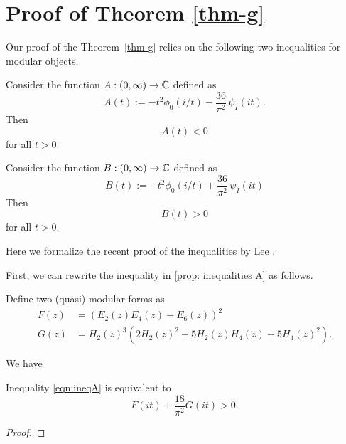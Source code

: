\section{Proof of Theorem \ref{thm-g}}\label{sec: g}
Our proof of the Theorem~\ref{thm-g} relies on the following two inequalities for modular objects.
\begin{proposition}\label{prop: inequalities A}
Consider the function $A:(0,\infty)\to\mathbb{C}$ defined as
\begin{equation}\label{eqn:defA}
A(t):=-t^2\phi_0(i/t)-\frac{36}{\pi^2}\,\psi_I(it).
\end{equation}
Then
\begin{equation}\label{eqn:ineqA}
  A(t) < 0
\end{equation}
for all $t > 0$.
\end{proposition}

\begin{proposition}\label{prop: inequalities B}
Consider the function $B:(0,\infty)\to\mathbb{C}$ defined as
\begin{equation}\label{eqn:defB}
  B(t) := -t^2\phi_0(i/t)+\frac{36}{\pi^2}\,\psi_I(it)
\end{equation}
Then
\begin{equation}\label{eqn:ineqB}
  B(t) > 0
\end{equation}
for all $t > 0$.
\end{proposition}

Here we formalize the recent proof of the inequalities by Lee \cite{Lee}.

First, we can rewrite the inequality in \ref{prop: inequalities A} as follows.

\begin{definition}
Define two (quasi) modular forms as
\begin{align}
  F(z) &= (E_2(z) E_4(z) - E_6(z))^2 \label{eqn:defF} \\
  G(z) &= H_2(z)^{3} (2 H_{2}(z)^{2} + 5 H_{2}(z) H_{4}(z) + 5 H_{4}(z)^{2}). \label{eqn:defG}
\end{align}
\end{definition}

\begin{lemma}\label{lem:identities}
We have
\end{lemma}

\begin{lemma}\label{lem:ineqAnew}
Inequality \eqref{eqn:ineqA} is equivalent to
\begin{equation}\label{eqn:ineqAnew}
  F(it) + \frac{18}{\pi^2} G(it) > 0.
\end{equation}
\end{lemma}
\begin{proof}

\end{proof}

